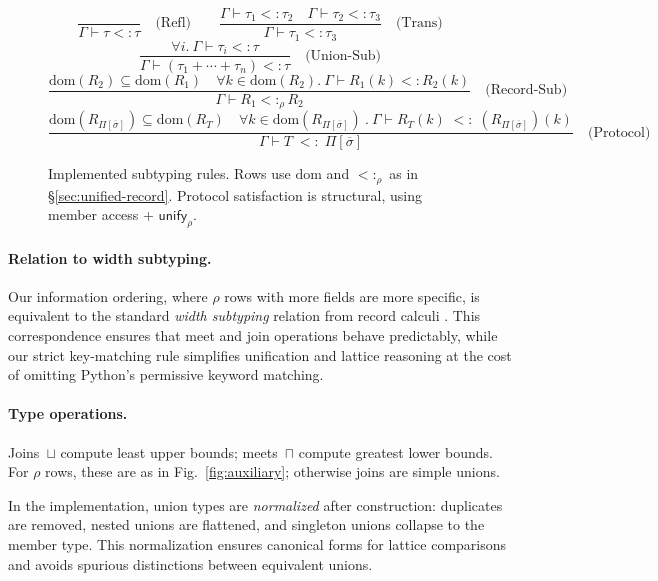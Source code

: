 \begin{figure*}[t]
\centering
\[
\frac{}{\Gamma \vdash \tau <: \tau} \quad \text{(Refl)}
\qquad
\frac{\Gamma \vdash \tau_1 <: \tau_2 \quad \Gamma \vdash \tau_2 <: \tau_3}{\Gamma \vdash \tau_1 <: \tau_3} \quad \text{(Trans)}
\]
\[
\frac{\forall i.\ \Gamma \vdash \tau_i <: \tau}{\Gamma \vdash (\tau_1 + \cdots + \tau_n) <: \tau} \quad \text{(Union-Sub)}
\]
\[
\frac{\mathrm{dom}(R_2) \subseteq \mathrm{dom}(R_1) \quad \forall k \in \mathrm{dom}(R_2).\ \Gamma \vdash R_1(k) <: R_2(k)}
     {\Gamma \vdash R_1 <:_\rho R_2} \quad \text{(Record-Sub)}
\]
\[
\frac{\mathrm{dom}(R_{\Pi[\overline{\sigma}]}) \subseteq \mathrm{dom}(R_T)
      \quad \forall k \in \mathrm{dom}(R_{\Pi[\overline{\sigma}]})\ .\ \Gamma \vdash R_T(k) \;<:\; (R_{\Pi[\overline{\sigma}]}\!)(k)}
     {\Gamma \vdash T \;<:\; \Pi[\overline{\sigma}]} \quad \text{(Protocol)}
\]
\caption{Implemented subtyping rules. Rows use $\mathrm{dom}$ and $<:_\rho$ as in \S\ref{sec:unified-record}. Protocol satisfaction is structural, using member access + $\mathsf{unify}_{\rho}$.}
\label{fig:subtyping}
\end{figure*}

\paragraph{Relation to width subtyping.}
Our information ordering, where $\rho$ rows with more fields are more specific, is
equivalent to the standard \emph{width subtyping} relation from record calculi
\cite{cardelli1992extensible}. This correspondence ensures that meet and join operations
behave predictably, while our strict key-matching rule simplifies unification and
lattice reasoning at the cost of omitting Python’s permissive keyword matching.

\paragraph{Type operations.}  
Joins~$\sqcup$ compute least upper bounds; meets~$\sqcap$ compute greatest lower bounds.  
For $\rho$ rows, these are as in Fig.~\ref{fig:auxiliary}; otherwise joins are simple unions.

In the implementation, union types are \emph{normalized} after construction: duplicates are removed, nested unions are flattened, and singleton unions collapse to the member type.  
This normalization ensures canonical forms for lattice comparisons and avoids spurious distinctions between equivalent unions.

